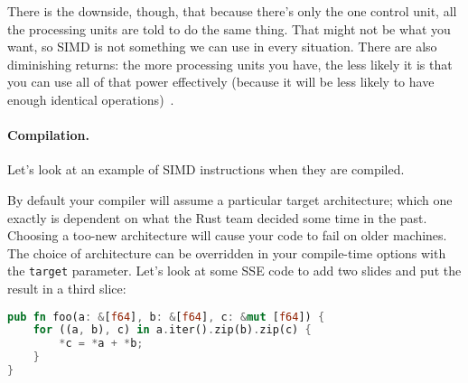 There is the downside, though, that because there's only the one control unit, all the processing units are told to do the same thing. That might not be what you want, so SIMD is not something we can use in every situation. There are also diminishing returns: the more processing units you have, the less likely it is that you can use all of that power effectively (because it will be less likely to have enough identical operations)~\cite{sse}.

\paragraph{Compilation.} Let's look at an example of SIMD instructions when they are compiled.

By default your compiler will assume a particular target architecture; which one exactly is dependent on what the Rust team decided some time in the past. Choosing a too-new architecture will cause your code to fail on older machines. The choice of architecture can be overridden in your compile-time options with the \texttt{target} parameter. Let's look at some SSE code to add two slides and put the result in a third slice:

\begin{lstlisting}[language=Rust]
pub fn foo(a: &[f64], b: &[f64], c: &mut [f64]) {
    for ((a, b), c) in a.iter().zip(b).zip(c) {
        *c = *a + *b;
    }
}\end{lstlisting}


